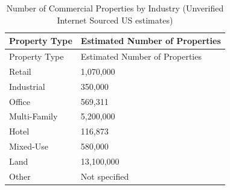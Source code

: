 \documentclass[
  12pt]{article}
\begin{document}
\begin{longtable}[]{@{}ll@{}}
\caption{Number of Commercial Properties by Industry (Unverified
Internet Sourced US estimates)}\label{tbl-Industry}\tabularnewline
\toprule\noalign{}
Property Type & Estimated Number of Properties \\
\midrule\noalign{}
\endfirsthead
\toprule\noalign{}
Property Type & Estimated Number of Properties \\
\midrule\noalign{}
\endhead
\bottomrule\noalign{}
\endlastfoot
Retail & 1,070,000 \\
Industrial & 350,000 \\
Office & 569,311 \\
Multi-Family & 5,200,000 \\
Hotel & 116,873 \\
Mixed-Use & 580,000 \\
Land & 13,100,000 \\
Other & Not specified \\
\end{longtable}
\end{document}
